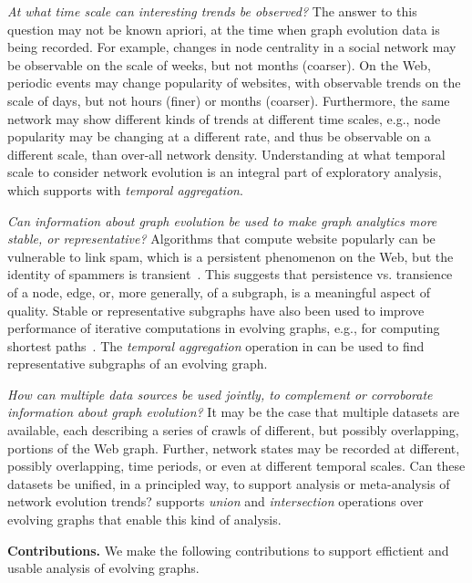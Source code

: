 {\em At what time scale can interesting trends be observed?} The
answer to this question may not be known apriori, at the time when
graph evolution data is being recorded.  For example, changes in node
centrality in a social network may be observable on the scale of
weeks, but not months (coarser).  On the Web, periodic events may
change popularity of websites, with observable trends on the scale of
days, but not hours (finer) or months (coarser).  Furthermore, the
same network may show different kinds of trends at different time
scales, e.g., node popularity may be changing at a different rate, and
thus be observable on a different scale, than over-all network
density.  Understanding at what temporal scale to consider network
evolution is an integral part of exploratory analysis, which \ql
supports with {\em temporal aggregation}.

{\em Can information about graph evolution be used to make graph
  analytics more stable, or representative?}  Algorithms that compute
website popularly can be vulnerable to link spam, which is a
persistent phenomenon on the Web, but the identity of spammers is
transient~\cite{DBLP:conf/cikm/YangQZGL07}.  This suggests that
persistence vs. transience of a node, edge, or, more generally, of a
subgraph, is a meaningful aspect of quality.  Stable or representative
subgraphs have also been used to improve performance of iterative
computations in evolving graphs, e.g., for computing shortest
paths~\cite{Ren2011}.  The {\em temporal aggregation} operation in \ql
{}can be used to find
representative subgraphs of an evolving graph.

{\em How can multiple data sources be used jointly, to complement or
  corroborate information about graph evolution?}  It may be the case
that multiple datasets are available, each describing a series of
crawls of different, but possibly overlapping, portions of the Web
graph.  Further, network states may be recorded at different, possibly
overlapping, time periods, or even at different temporal scales.  Can
these datasets be unified, in a principled way, to support analysis or
meta-analysis of network evolution trends?  \ql supports {\em union}
and {\em intersection} operations over evolving graphs that enable
this kind of analysis.

{\bf Contributions.} We make the following contributions to support
effictient and usable analysis of evolving graphs.

